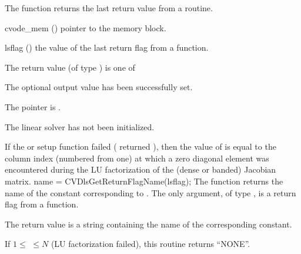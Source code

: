 {
  The function  returns the
  last return value from a {\cvdls} routine. 
}
{
  \begin{args}
  \item[cvode\_mem] ()
    pointer to the {\cvode} memory block.
  \item[lsflag] ()
    the value of the last return flag from a {\cvdls} function.
  \end{args}
}
{
  The return value  (of type ) is one of
  \begin{args}
  \item[\Id{CVDLS\_SUCCESS}] 
    The optional output value has been successfully set.
  \item[\Id{CVDLS\_MEM\_NULL}]
    The  pointer is .
  \item[\Id{CVDLS\_LMEM\_NULL}]
    The {\cvdls} linear solver has not been initialized.
  \end{args}
}
{
  If the {\sunlinsoldense} or {\sunlinsolband} setup function failed
  ( returned ), then the value of
   is equal to the column index (numbered from one) at
  which a zero diagonal element was encountered during the LU
  factorization of the (dense or banded) Jacobian matrix.
}
{
  name = CVDlsGetReturnFlagName(lsflag);
}
{
  The function  returns the
  name of the {\cvdls} constant corresponding to .
}
{
  The only argument, of type , is a return flag from a {\cvdls}
  function.
}
{
  The return value is a string containing the name of the corresponding constant.

  If $1 \leq $  $ \leq N$ (LU factorization failed), this routine
  returns ``NONE''.
}
{}


